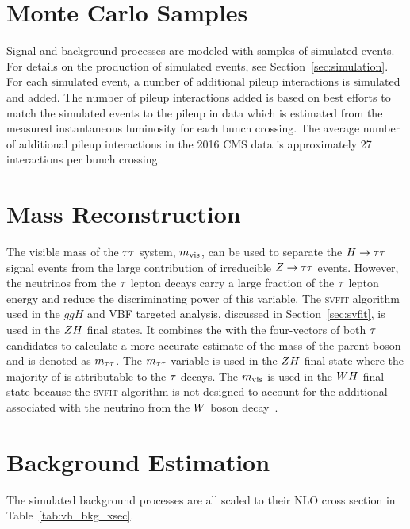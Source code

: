 \section{Monte Carlo Samples}
\label{sec:vh_mc_samples}
Signal and background processes are modeled with samples of simulated events.
For details on the production of simulated events, see Section~\ref{sec:simulation}.
For each simulated event, a number of additional pileup interactions is simulated and added. 
The number of pileup interactions added is based on best efforts to match the simulated
events to the pileup in data which is estimated from the measured instantaneous
luminosity for each bunch crossing. The average number of additional pileup interactions in
the 2016 CMS data is approximately 27 interactions per bunch crossing.



\section{Mass Reconstruction}
The visible mass of the $\tau\tau$ system, $m_\text{vis}$, can be used to separate
the $H\to\tau\tau$ signal events
from the large contribution of irreducible $Z \to \tau \tau$ events.
However, the neutrinos from the $\tau$ lepton decays carry a large fraction of
the $\tau$ lepton energy and reduce the discriminating power of this variable.
The \textsc{svfit} algorithm used in the $ggH$ and VBF targeted analysis,
discussed in Section~\ref{sec:svfit}, is used in the $ZH$ final states.
It combines the \etvecmiss 
with the four-vectors of both $\tau$ candidates to calculate a more accurate 
estimate of the mass of the parent boson and is denoted as $m_{\tau\tau}$. The
$m_{\tau\tau}$ variable is used in the $ZH$ final state where the majority of 
\etvecmiss is attributable to the $\tau$ decays. The $m_\text{vis}$ is used in the 
$WH$ final state because the \textsc{svfit} algorithm is not designed to account for the 
additional \etvecmiss associated with the neutrino from the $W$ boson
decay~\cite{Bianchini:2014vza}. 



\section{Background Estimation}
\label{sec:vh_background_estimation}
The simulated background processes are all scaled to their NLO cross section in Table~\ref{tab:vh_bkg_xsec}.

